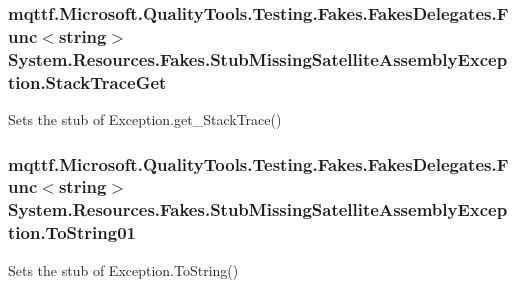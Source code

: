 \hypertarget{class_system_1_1_resources_1_1_fakes_1_1_stub_missing_satellite_assembly_exception_ad3be6d81fecc16a9019649f6c220866b}{
\subsubsection[{Stack\-Trace\-Get}]{\setlength{\rightskip}{0pt plus 5cm}mqttf.\-Microsoft.\-Quality\-Tools.\-Testing.\-Fakes.\-Fakes\-Delegates.\-Func$<$string$>$ System.\-Resources.\-Fakes.\-Stub\-Missing\-Satellite\-Assembly\-Exception.\-Stack\-Trace\-Get}}\label{class_system_1_1_resources_1_1_fakes_1_1_stub_missing_satellite_assembly_exception_ad3be6d81fecc16a9019649f6c220866b}


Sets the stub of Exception.\-get\-\_\-\-Stack\-Trace()

\hypertarget{class_system_1_1_resources_1_1_fakes_1_1_stub_missing_satellite_assembly_exception_afb94e4bafa79779b8f3698933b6c8800}{
\subsubsection[{To\-String01}]{\setlength{\rightskip}{0pt plus 5cm}mqttf.\-Microsoft.\-Quality\-Tools.\-Testing.\-Fakes.\-Fakes\-Delegates.\-Func$<$string$>$ System.\-Resources.\-Fakes.\-Stub\-Missing\-Satellite\-Assembly\-Exception.\-To\-String01}}\label{class_system_1_1_resources_1_1_fakes_1_1_stub_missing_satellite_assembly_exception_afb94e4bafa79779b8f3698933b6c8800}


Sets the stub of Exception.\-To\-String()



